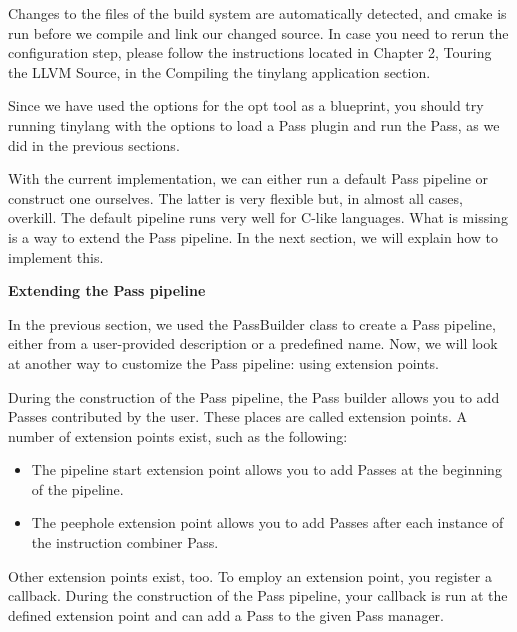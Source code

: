 Changes to the files of the build system are automatically detected, and cmake is run before we compile and link our changed source. In case you need to rerun the configuration step, please follow the instructions located in Chapter 2, Touring the LLVM Source, in the Compiling the tinylang application section.\par

Since we have used the options for the opt tool as a blueprint, you should try running tinylang with the options to load a Pass plugin and run the Pass, as we did in the previous sections.\par

With the current implementation, we can either run a default Pass pipeline or construct one ourselves. The latter is very flexible but, in almost all cases, overkill. The default pipeline runs very well for C-like languages. What is missing is a way to extend the Pass pipeline. In the next section, we will explain how to implement this.\par



\hspace*{\fill} \par %
\textbf{Extending the Pass pipeline}


In the previous section, we used the PassBuilder class to create a Pass pipeline, either from a user-provided description or a predefined name. Now, we will look at another way to customize the Pass pipeline: using extension points.\par

During the construction of the Pass pipeline, the Pass builder allows you to add Passes contributed by the user. These places are called extension points. A number of extension points exist, such as the following:\par

\begin{itemize}
	\item The pipeline start extension point allows you to add Passes at the beginning of the pipeline.
	\item The peephole extension point allows you to add Passes after each instance of the 	instruction combiner Pass.
\end{itemize}

Other extension points exist, too. To employ an extension point, you register a callback. During the construction of the Pass pipeline, your callback is run at the defined extension point and can add a Pass to the given Pass manager.\par

